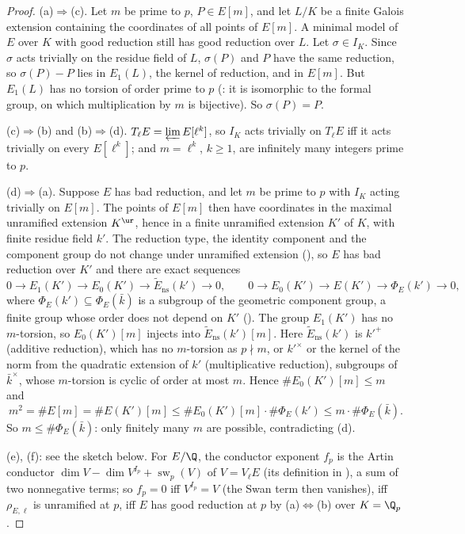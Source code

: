 \begin{proof}
(a)$\Rightarrow$(c). Let $m$ be prime to $p$, $P\in E[m]$, and let $L/K$ be a finite Galois extension containing the coordinates of all points of
$E[m]$. A minimal model of $E$ over $K$ with good reduction still has good reduction over $L$. Let $\sigma\in I_K$. Since $\sigma$ acts trivially on
the residue field of $L$, $\sigma(P)$ and $P$ have the same reduction, so $\sigma(P)-P$ lies in $E_1(L)$, the kernel of reduction, and in $E[m]$. But
$E_1(L)$ has no torsion of order prime to $p$ (: it is isomorphic to the formal group, on which multiplication by $m$ is
bijective). So $\sigma(P)=P$.

(c)$\Rightarrow$(b) and (b)$\Rightarrow$(d). $T_\ell E=\varprojlim E[\ell^k]$, so $I_K$ acts trivially on $T_\ell E$ iff it acts trivially on every $E[\ell^k]$; and
$m=\ell^k$, $k\ge1$, are infinitely many integers prime to $p$.

(d)$\Rightarrow$(a). Suppose $E$ has bad reduction, and let $m$ be prime to $p$ with $I_K$ acting trivially on $E[m]$. The points of $E[m]$ then have
coordinates in the maximal unramified extension $K^{\ur}$, hence in a finite unramified extension $K'$ of $K$, with finite residue field $k'$.
The reduction type, the identity component and the component group do not change under unramified extension (), so
$E$ has bad reduction over $K'$ and there are exact sequences
\[
0\to E_1(K')\to E_0(K')\to\tilde E_{\mathrm{ns}}(k')\to0,\qquad 0\to E_0(K')\to E(K')\to\Phi_E(k')\to0,
\]
where $\Phi_E(k')\subseteq\Phi_E(\bar k)$ is a subgroup of the geometric component group, a finite group whose order does not depend on $K'$
(). The group $E_1(K')$ has no $m$-torsion, so $E_0(K')[m]$ injects into $\tilde E_{\mathrm{ns}}(k')[m]$. Here $\tilde E_{\mathrm{ns}}(k')$ is
$k'^+$ (additive reduction), which has no $m$-torsion as $p\nmid m$, or $k'^\times$ or the kernel of the norm from the quadratic extension of $k'$
(multiplicative reduction), subgroups of $\bar k^\times$, whose $m$-torsion is cyclic of order at most $m$. Hence $\#E_0(K')[m]\le m$ and
\[
m^2=\#E[m]=\#E(K')[m]\le\#E_0(K')[m]\cdot\#\Phi_E(k')\le m\cdot\#\Phi_E(\bar k) .
\]
So $m\le\#\Phi_E(\bar k)$: only finitely many $m$ are possible, contradicting (d).

(e), (f): see the sketch below. For $E/\Q$, the conductor exponent $f_p$ is the Artin conductor $\dim V-\dim V^{I_p}+\operatorname{sw}_p(V)$ of $V=V_\ell E$
(its definition in ), a sum of two nonnegative terms; so $f_p=0$ iff $V^{I_p}=V$ (the Swan term then vanishes), iff $\rho_{E,\ell}$ is
unramified at $p$, iff $E$ has good reduction at $p$ by (a)$\Leftrightarrow$(b) over $K=\Q_p$.
\end{proof}

